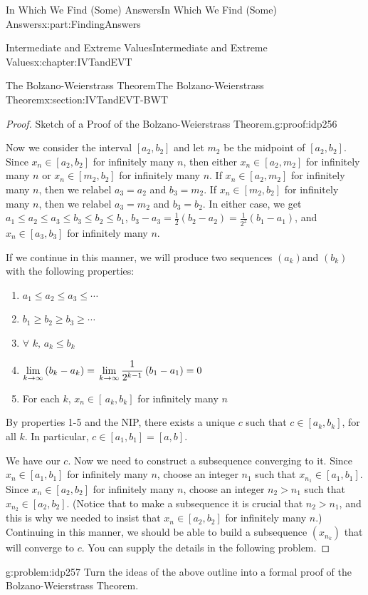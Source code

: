 \documentclass[oneside,10pt,]{book}
\numberwithin{equation}{section}
\begin{document}
\begin{partptx}{In Which We Find (Some) Answers}{}{In Which We Find (Some) Answers}{}{}{x:part:FindingAnswers}
\begin{chapterptx}{Intermediate and Extreme Values}{}{Intermediate and Extreme Values}{}{}{x:chapter:IVTandEVT}
\begin{sectionptx}{The Bolzano-Weierstrass Theorem}{}{The Bolzano-Weierstrass Theorem}{}{}{x:section:IVTandEVT-BWT}
\begin{proof}{Sketch of a Proof of the Bolzano-Weierstrass Theorem.}{g:proof:idp256}
\par
Now we consider the interval \([a_2,b_2]\) and let \(m_2\) be the midpoint of \([a_2,b_2]\). Since \(x_n\in[a_2,b_2]\) for infinitely many \(n\), then either \(x_n\in[a_2,m_2]\) for infinitely many \(n\) or \(x_n\in[m_2,b_2]\) for infinitely many \(n\). If \(x_n\in[a_2,m_2]\) for infinitely many \(n\), then we relabel \(a_3=a_2\) and \(b_3=m_2\). If \(x_n\in[m_2,b_2]\) for infinitely many \(n\), then we relabel \(a_3=m_2\) and \(b_3=b_2\). In either case, we get \(a_1\leq a_2\leq a_3\leq b_3\leq b_2\leq b_1\), \(b_3-a_3=\frac{1}{2}\left(b_2-a_2\right)=\frac{1}{2^2}\left(b_1-a_1\right)\), and \(x_n\in[a_3,b_3]\) for infinitely many \(n\).%
\par
If we continue in this manner, we will produce two sequences \(\left(a_k\right)\)and \(\left(b_k\right)\) with the following properties:%
\begin{enumerate}
\item{}\(\displaystyle a_1\leq a_2\leq a_3\leq\cdots\)%
\item{}\(\displaystyle b_1\geq b_2\geq b_3\geq\cdots\)%
\item{}\(\forall\) \(k,\,a_k\leq b_k\)%
\item{}\(\displaystyle \displaystyle\lim_{k\rightarrow\infty}\left(b_k-a_k\right)=\,\lim_{k\rightarrow\infty} \frac{1}{2^{k-1}}\left(b_1-a_1\right)=0\)%
\item{}For each \(k\), \(x_n\in[\,a_k,b_k]\) for infinitely many \(n\)%
\end{enumerate}
%
\par
By properties 1-5 and the NIP, there exists a unique \(c\) such that \(c\in[a_k,b_k]\), for all \(k\). In particular, \(c\in[a_1,b_1]=[a,b]\).%
\par
We have our \(c\). Now we need to construct a subsequence converging to it. Since \(x_n\in[a_1,b_1]\) for infinitely many \(n\), choose an integer \(n_1\) such that \(x_{n_1}\in[a_1,b_1]\). Since \(x_n\in[a_2,b_2]\) for infinitely many \(n\), choose an integer \(n_2>n_1\) such that \(x_{n_2}\in[a_2,b_2]\). (Notice that to make a subsequence it is crucial that \(n_2>n_1\), and this is why we needed to insist that \(x_n\in[a_2,b_2]\) for infinitely many \(n\).) Continuing in this manner, we should be able to build a subsequence \(\left(x_{n_k}\right)\) that will converge to \(c\). You can supply the details in the following problem.%
\end{proof}
\begin{problem}{}{g:problem:idp257}%
 Turn the ideas of the above outline into a formal proof of the Bolzano-Weierstrass Theorem.%

\end{problem}
\end{sectionptx}
\end{chapterptx}
\end{partptx}
\end{document}
